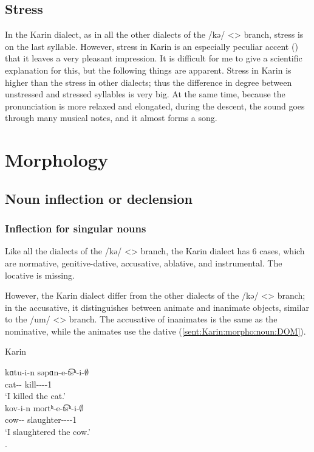 \subsection{Stress}

In the Karin dialect, as in all the other dialects of the /kə/ <> branch, stress is on the last syllable. However, stress in Karin is an especially peculiar accent () that it leaves a very pleasant impression. It is difficult for me to give a scientific explanation for this, but the following things are apparent. Stress in Karin is higher than the stress in other dialects; thus the difference in degree between unstressed and stressed syllables is very big. At the same time, because the pronunciation is more relaxed and elongated, during the descent, the sound goes through many musical notes, and it almost forms a song. 

\section{Morphology}
\subsection{Noun inflection or declension}

\subsubsection{Inflection for singular nouns}

Like all the dialects of the /kə/ <> branch, the Karin dialect has 6 cases, which are normative, genitive-dative, accusative, ablative, and instrumental. The locative is missing. 

However, the Karin dialect differ from the other dialects of the /kə/ <> branch; in the accusative, it distinguishes between animate and inanimate objects, similar to the /um/ <> branch. The accusative of inanimates is the same as the nominative, while the animates use the dative (\ref{sent:Karin:morpho:noun:DOM}). 


\begin{exe}
	\ex Karin \label{sent:Karin:morpho:noun:DOM}
	\begin{xlist}
		\ex \gll kɑtu-i-n səpɑn-e-t͡sʰ-i-$\emptyset$ \\ 
		cat-{\dat}-{} kill-{\thgloss}-{\aor}-{\pst}-1{\sg} \\
		\trans `I killed the cat.'\\
		\ex \gll kov-i-n moɾtʰ-e-t͡sʰ-i-$\emptyset$ \\ 
		cow-{\dat}-{} slaughter-{\thgloss}-{\aor}-{\pst}-1{\sg} \\
		\trans `I slaughtered the cow.'\\
		. 
	\end{xlist}
\end{exe}

